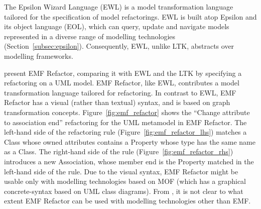 The Epsilon Wizard Language (EWL) \cite{kolovos07ewl} is a model transformation language tailored for the specification of model refactorings. EWL is built atop Epsilon and its object language (EOL), which can query, update and navigate models represented in a diverse range of modelling technologies (Section~\ref{subsec:epsilon}). Consequently, EWL, unlike LTK, abstracts over modelling frameworks.

\cite{arendt09refactoring} present EMF Refactor, comparing it with EWL and the LTK by specifying a refactoring on a UML model. EMF Refactor, like EWL, contributes a model transformation language tailored for refactoring. In contrast to EWL, EMF Refactor has a visual (rather than textual) syntax, and is based on graph transformation concepts. Figure~\ref{fig:emf_refactor} shows the ``Change attribute to association end'' refactoring for the UML metamodel in EMF Refactor. The left-hand side of the refactoring rule (Figure~\ref{fig:emf_refactor_lhs}) matches a Class whose owned attributes contains a Property whose type has the same name as a Class. The right-hand side of the rule (Figure~\ref{fig:emf_refactor_rhs}) introduces a new Association, whose member end is the Property matched in the left-hand side of the rule. Due to the visual syntax, EMF Refactor might be usable only with modelling technologies based on MOF (which has a graphical concrete-syntax based on UML class diagrams).  From \cite{arendt09refactoring}, it is not clear to what extent EMF Refactor can be used with modelling technologies other than EMF.

